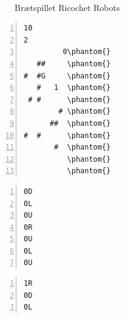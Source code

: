\documentclass[10pt,a4paper]{article}
\begin{document}

\begin{figure}[h]
\centering
\hfill
{}
\hfill
~
\caption{Brætspillet Ricochet Robots}
\label{FIG:REALS}
\end{figure}

\newsavebox{\simpleboard}
\begin{lrbox}\simpleboard%
\hspace{1cm}
\begin{minipage}[b]{2.1cm}%
\begin{Verbatim}[frame=single, numbers=left,showspaces, commandchars=\\\{\}, baselinestretch=0.64]
10
2
         0\phantom{}
   ##     \phantom{}
#  #G     \phantom{}
   #   1  \phantom{}
 # #      \phantom{}
        # \phantom{}
      ##  \phantom{}
#  #      \phantom{}
       #  \phantom{}
          \phantom{}
          \phantom{}
\end{Verbatim}%
\end{minipage}
\hspace{1cm}
\end{lrbox}

\newsavebox{\simpleboardsolution}
\begin{lrbox}\simpleboardsolution%
\hspace{1cm}
\begin{minipage}[b]{2.1cm}%
\begin{Verbatim}[frame=single, numbers=left,showspaces, commandchars=\\\{\}, baselinestretch=0.64, label={\scriptsize Løsning 1}]
0D
0L
0U
0R
0U
0L
0U
\end{Verbatim}
\vspace{-4pt}
\begin{Verbatim}[frame=single, numbers=left,showspaces, commandchars=\\\{\}, baselinestretch=0.64, label={\scriptsize Løsning 2}]
1R
0D
0L
\end{Verbatim}%
\end{minipage}
\hspace{1cm}
\end{lrbox}
\end{document}
